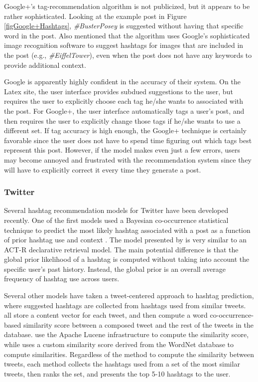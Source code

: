 \documentclass[man,floatsintext,donotrepeattitle]{apa6}
\begin{document}
Google+'s tag-recommendation algorithm is not publicized, but it appears to be rather sophisticated.
Looking at the example post in Figure \ref{figGoogle+Hashtags}, \emph{\#BusterPosey} is suggested without having that specific word in the post.
Also \textcite{GoogleKeynote2013} mentioned that the algorithm uses Google's sophisticated image recognition software to suggest hashtags for images that are included in the post (e.g., \emph{\#EiffelTower}),
even when the post does not have any keywords to provide additional context.

Google is apparently highly confident in the accuracy of their system.
On the Latex site, the user interface provides subdued suggestions to the user, but requires the user to explicitly choose each tag he/she wants to associated with the post.
For Google+, the user interface automatically tags a user's post, and then requires the user to explicitly change those tags if he/she wants to use a different set.
If tag accuracy is high enough, the Google+ technique is certainly favorable since the user does not have to spend time figuring out which tags best represent this post.
However, if the model makes even just a few errors, users may become annoyed and frustrated with the recommendation system since they will have to explicitly correct it every time they generate a post.

\subsubsection{Twitter}

Several hashtag recommendation models for Twitter have been developed recently.
One of the first models used a Bayesian co-occurrence statistical technique to predict the most likely hashtag associated with a post as a function of prior hashtag use and context \parencite{Mazzia2009}.
The model presented by \textcite{Mazzia2009} is very similar to an ACT-R declarative retrieval model.
The main potential difference is that the global prior likelihood of a hashtag is computed without taking into account the specific user's past history.
Instead, the global prior is an overall average frequency of hashtag use across users.

Several other models have taken a tweet-centered approach to hashtag prediction, where suggested hashtags are collected from hashtags used from similar tweets.
\textcites{Li2011, Zangerle2011, Kywe2012} all store a content vector for each tweet, and then compute a word co-occurrence-based similarity score between a composed tweet and the rest of the tweets in the database.
\textcites{Zangerle2011, Kywe2012} use the Apache Lucene infrastructure to compute the similarity score, while \textcite{Li2011} uses a custom similarity score derived from the WordNet database to compute similarities.
Regardless of the method to compute the similarity between tweets, each method collects the hashtags used from a set of the most similar tweets, then ranks the set, and presents the top 5-10 hashtags to the user.
\end{document}
